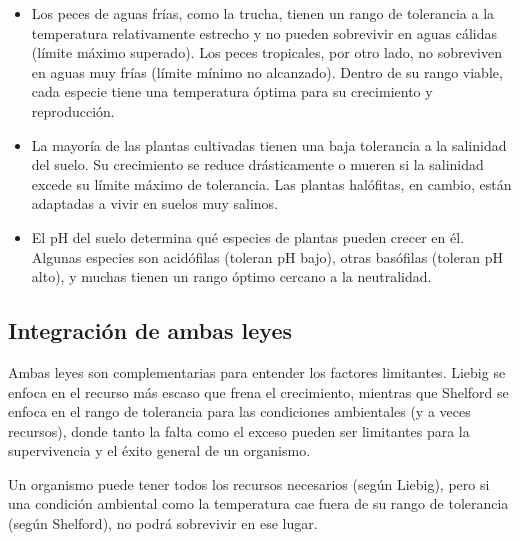 \documentclass[
]{book}
\providecommand{\tightlist}{%
  \setlength{\itemsep}{0pt}\setlength{\parskip}{0pt}}
\begin{document}
\begin{itemize}
  \begin{itemize}
  \tightlist
  \item
    Los peces de aguas frías, como la trucha, tienen un rango de tolerancia a la temperatura relativamente estrecho y no pueden sobrevivir en aguas cálidas (límite máximo superado). Los peces tropicales, por otro lado, no sobreviven en aguas muy frías (límite mínimo no alcanzado). Dentro de su rango viable, cada especie tiene una temperatura óptima para su crecimiento y reproducción.
  \item
    La mayoría de las plantas cultivadas tienen una baja tolerancia a la salinidad del suelo. Su crecimiento se reduce drásticamente o mueren si la salinidad excede su límite máximo de tolerancia. Las plantas halófitas, en cambio, están adaptadas a vivir en suelos muy salinos.
  \item
    El pH del suelo determina qué especies de plantas pueden crecer en él. Algunas especies son acidófilas (toleran pH bajo), otras basófilas (toleran pH alto), y muchas tienen un rango óptimo cercano a la neutralidad.
  \end{itemize}
\end{itemize}

\subsection*{\texorpdfstring{\textbf{Integración de ambas leyes}}{Integración de ambas leyes}}\label{liebigshelford}

Ambas leyes son complementarias para entender los factores limitantes. Liebig se enfoca en el recurso más escaso que frena el crecimiento, mientras que Shelford se enfoca en el rango de tolerancia para las condiciones ambientales (y a veces recursos), donde tanto la falta como el exceso pueden ser limitantes para la supervivencia y el éxito general de un organismo.

Un organismo puede tener todos los recursos necesarios (según Liebig), pero si una condición ambiental como la temperatura cae fuera de su rango de tolerancia (según Shelford), no podrá sobrevivir en ese lugar.


\end{document}
